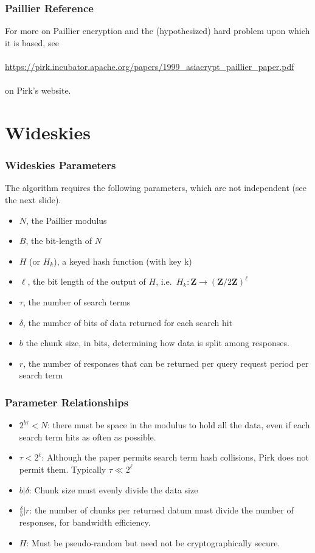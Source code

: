 \documentclass{beamer}
\makeatletter
\DeclareRobustCommand*{\&}{%
  \nfss@text{%
    \fontfamily{LinuxBiolinumT-TLF}%
    \selectfont
    \symbol{`\&}%
  }%
}
\makeatother
\begin{document}
\begin{frame}
  \frametitle{Paillier Reference}
  For more on Paillier encryption and the (hypothesized) hard problem upon
  which it is based, see\\~\\
  \mbox{\scriptsize \url{https://pirk.incubator.apache.org/papers/1999_asiacrypt_paillier_paper.pdf}}\\~\\
  on Pirk's website.
\end{frame}

\section{Wideskies}

\begin{frame}
  \frametitle{Wideskies Parameters}
  The algorithm requires the following parameters, which are not independent
  (see the next slide).
  \begin{itemize}
    \item $N$, the Paillier modulus
    \item $B$, the bit-length of $N$
    \item $H$ (or $H_k$), a keyed hash function (with key k)
    \item $\ell$, the bit length of the output of $H$, i.e.\
      $H_k:\mathbf{Z}\rightarrow (\mathbf{Z}/2\mathbf{Z})^\ell$
    \item $\tau$, the number of search terms
    \item $\delta$, the number of bits of data returned for each search hit
    \item $b$ the chunk size, in bits, determining how data is split among
      responses.
    \item $r$, the number of responses that can be returned per query request
      period per search term
  \end{itemize}
\end{frame}

\begin{frame}
  \frametitle{Parameter Relationships}
  \begin{itemize}
    \item $2^{b\tau} < N$: there must be space in the modulus to hold all the
      data, even if each search term hits as often as possible.
    \item $\tau < 2^\ell$: Although the paper permits search term hash
    collisions, Pirk does not permit them. Typically $\tau \ll 2^\ell$
    \item $b|\delta$: Chunk size must evenly divide the data size
    \item $\frac{\delta}{b} | r$: the number of chunks per returned datum must
      divide the number of responses, for bandwidth efficiency.
    \item $H$: Must be pseudo-random but need not be cryptographically secure.
  \end{itemize}
\end{frame}
\end{document}
